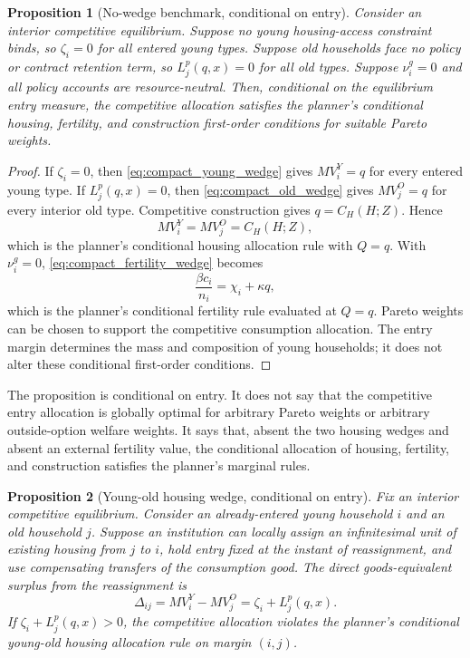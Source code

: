 \documentclass[11pt]{article}
\newtheorem{proposition}{Proposition}
\newcommand{\1}{\mathbf 1}
\begin{document}
\begin{proposition}[No-wedge benchmark, conditional on entry]
Consider an interior competitive equilibrium. Suppose no young housing-access constraint binds, so $\zeta_i=0$ for all entered young types. Suppose old households face no policy or contract retention term, so $L_j^p(q,x)=0$ for all old types. Suppose $\nu_i^g=0$ and all policy accounts are resource-neutral. Then, conditional on the equilibrium entry measure, the competitive allocation satisfies the planner's conditional housing, fertility, and construction first-order conditions for suitable Pareto weights.
\end{proposition}

\begin{proof}
If $\zeta_i=0$, then \eqref{eq:compact_young_wedge} gives $MV_i^Y=q$ for every entered young type. If $L_j^p(q,x)=0$, then \eqref{eq:compact_old_wedge} gives $MV_j^O=q$ for every interior old type. Competitive construction gives $q=C_H(H;Z)$. Hence
\[
MV_i^Y=MV_j^O=C_H(H;Z),
\]
which is the planner's conditional housing allocation rule with $Q=q$. With $\nu_i^g=0$, \eqref{eq:compact_fertility_wedge} becomes
\[
\frac{\beta c_i}{n_i}=\chi_i+\kappa q,
\]
which is the planner's conditional fertility rule evaluated at $Q=q$. Pareto weights can be chosen to support the competitive consumption allocation. The entry margin determines the mass and composition of young households; it does not alter these conditional first-order conditions.
\end{proof}

The proposition is conditional on entry. It does not say that the competitive entry allocation is globally optimal for arbitrary Pareto weights or arbitrary outside-option welfare weights. It says that, absent the two housing wedges and absent an external fertility value, the conditional allocation of housing, fertility, and construction satisfies the planner's marginal rules.

\begin{proposition}[Young-old housing wedge, conditional on entry]
Fix an interior competitive equilibrium. Consider an already-entered young household $i$ and an old household $j$. Suppose an institution can locally assign an infinitesimal unit of existing housing from $j$ to $i$, hold entry fixed at the instant of reassignment, and use compensating transfers of the consumption good. The direct goods-equivalent surplus from the reassignment is
\begin{equation}
\Delta_{ij}
=
MV_i^Y-MV_j^O
=
\zeta_i+L_j^p(q,x).
\label{eq:compact_local_wedge}
\end{equation}
If $\zeta_i+L_j^p(q,x)>0$, the competitive allocation violates the planner's conditional young-old housing allocation rule on margin $(i,j)$.
\end{proposition}
\end{document}

